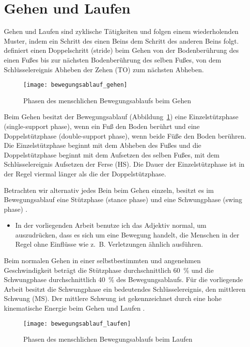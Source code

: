 

\section{Gehen und Laufen} 

\label{sec:gehen_und_laufen}

Gehen und Laufen sind zyklische Tätigkeiten und folgen einem wiederholenden Muster, indem ein Schritt des einen Beins dem Schritt des anderen Beins folgt. \citet[][S.~9]{Bartlett2007} definiert einen Doppelschritt (stride) beim Gehen von der Bodenberührung des einen Fußes bis zur nächsten Bodenberührung des selben Fußes, von dem Schlüsselereignis Abheben der Zehen (\ac{TO}) zum nächsten Abheben. 
\begin{figure}
	[!htb] \centering 
	\texttt{[image: bewegungsablauf\_gehen]} \caption[Phasen des menschlichen Bewegungsablaufs beim Gehen]{Phasen des menschlichen Bewegungsablaufs beim Gehen}\label{fig:bewegungsablauf_gehen} 
\end{figure}

Beim Gehen besitzt der Bewegungsablauf (Abbildung~\ref{fig:bewegungsablauf_gehen}) eine Einzelstützphase (single-support phase), wenn ein Fuß den Boden berührt und eine Doppelstützphase (double-support phase), wenn beide Füße den Boden berühren. Die Einzelstützphase beginnt mit dem Abheben des Fußes und die Doppelstützphase beginnt mit dem Aufsetzen des selben Fußes, mit dem Schlüsselereignis Aufsetzen der Ferse (\ac{HS}). Die Dauer der Einzelstützphase ist in der Regel viermal länger als die der Doppelstützphase. 

Betrachten wir alternativ jedes Bein beim Gehen einzeln, besitzt es im Bewegungsablauf eine Stützphase (stance phase) und eine Schwungphase (swing phase) \citep{Bartlett2007}. 
\begin{itemize}
	
	\item In der vorliegenden Arbeit benutze ich das Adjektiv normal, um auszudrücken, dass es sich um eine Bewegung handelt, die Menschen in der Regel ohne Einflüsse wie z.~B. Verletzungen ähnlich ausführen. 
\end{itemize}

Beim normalen Gehen in einer selbstbestimmten und angenehmen Geschwindigkeit beträgt die Stützphase durchschnittlich 60~\% und die Schwungphase durchschnittlich 40~\% des Bewegungsablaufs. Für die vorliegende Arbeit besitzt die Schwungphase ein bedeutendes Schlüsselereignis, den mittleren Schwung (\ac{MS}). Der mittlere Schwung ist gekennzeichnet durch eine hohe kinematische Energie beim Gehen und Laufen \citep{Novacheck1998}. 
\begin{figure}
	[!htb] \centering 
	\texttt{[image: bewegungsablauf\_laufen]} \caption[Phasen des menschlichen Bewegungsablaufs beim Laufen]{Phasen des menschlichen Bewegungsablaufs beim Laufen}\label{fig:bewegungsablauf_laufen} 
\end{figure}

